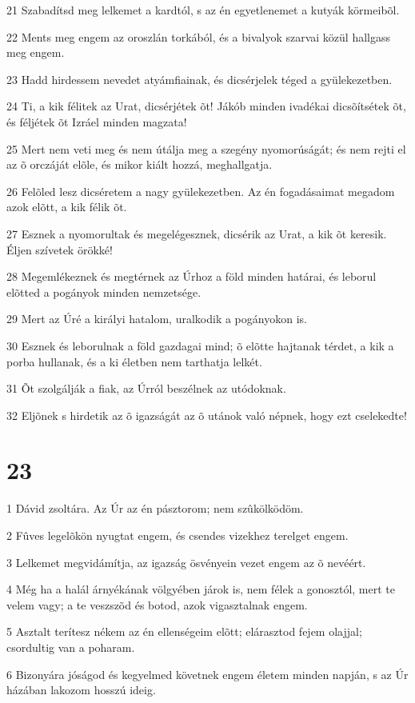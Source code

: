 \par 21 Szabadítsd meg lelkemet a kardtól, s az én egyetlenemet a kutyák körmeibõl.
\par 22 Ments meg engem az oroszlán torkából, és a bivalyok szarvai közül hallgass meg engem.
\par 23 Hadd hirdessem nevedet atyámfiainak, és dicsérjelek téged a gyülekezetben.
\par 24 Ti, a kik félitek az Urat, dicsérjétek õt! Jákób minden ivadékai dicsõítsétek õt, és féljétek õt Izráel minden magzata!
\par 25 Mert nem veti meg és nem útálja meg a szegény nyomorúságát; és nem rejti el az õ orczáját elõle, és mikor kiált hozzá, meghallgatja.
\par 26 Felõled lesz dicséretem a nagy gyülekezetben. Az én fogadásaimat megadom azok elõtt, a kik félik õt.
\par 27 Esznek a nyomorultak és megelégesznek, dicsérik az Urat, a kik õt keresik. Éljen szívetek örökké!
\par 28 Megemlékeznek és megtérnek az Úrhoz a föld minden határai, és leborul elõtted a pogányok minden nemzetsége.
\par 29 Mert az Úré a királyi hatalom, uralkodik a pogányokon is.
\par 30 Esznek és leborulnak a föld gazdagai mind; õ elõtte hajtanak térdet, a kik a porba hullanak, és a ki életben nem tarthatja lelkét.
\par 31 Õt szolgálják a fiak, az Úrról beszélnek az utódoknak.
\par 32 Eljõnek s hirdetik az õ igazságát az õ utánok való népnek, hogy ezt cselekedte!

\chapter{23}

\par 1 Dávid zsoltára. Az Úr az én pásztorom; nem szûkölködöm.
\par 2 Fûves legelõkön nyugtat engem, és csendes vizekhez terelget engem.
\par 3 Lelkemet megvidámítja, az igazság ösvényein vezet engem az õ nevéért.
\par 4 Még ha a halál árnyékának völgyében járok is, nem félek a gonosztól, mert te velem vagy; a te veszszõd és botod, azok vigasztalnak engem.
\par 5 Asztalt terítesz nékem az én ellenségeim elõtt; elárasztod fejem olajjal; csordultig van a poharam.
\par 6 Bizonyára jóságod és kegyelmed követnek engem életem minden napján, s az Úr házában lakozom hosszú ideig.

